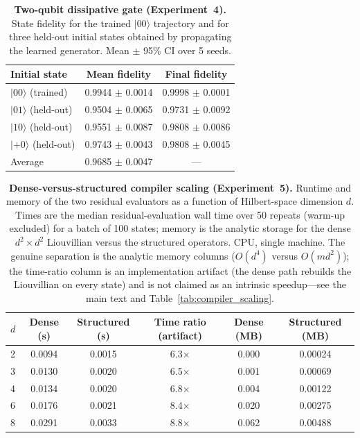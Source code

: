 \documentclass[11pt]{article}
\begin{document}
\begin{table}[ht]
\centering
\caption{\textbf{Two-qubit dissipative gate (Experiment~4).} State fidelity for the trained $\lvert 00\rangle$ trajectory and for three held-out initial states obtained by propagating the learned generator. Mean $\pm$ 95\% CI over 5 seeds.}
\label{tab:exp4}
\begin{tabular}{lcc}
\toprule
Initial state & Mean fidelity & Final fidelity \\
\midrule
$\lvert 00\rangle$ (trained) & 0.9944 $\pm$ 0.0014 & 0.9998 $\pm$ 0.0001 \\
$\lvert 01\rangle$ (held-out) & 0.9504 $\pm$ 0.0065 & 0.9731 $\pm$ 0.0092 \\
$\lvert 10\rangle$ (held-out) & 0.9551 $\pm$ 0.0087 & 0.9808 $\pm$ 0.0086 \\
$\lvert {+}0\rangle$ (held-out) & 0.9743 $\pm$ 0.0043 & 0.9808 $\pm$ 0.0045 \\
\midrule
Average & 0.9685 $\pm$ 0.0047 & --- \\
\bottomrule
\end{tabular}
\end{table}

\begin{table}[ht]
\centering
\caption{\textbf{Dense-versus-structured compiler scaling (Experiment~5).} Runtime and memory of the two residual evaluators as a function of Hilbert-space dimension $d$. Times are the median residual-evaluation wall time over 50 repeats (warm-up excluded) for a batch of 100 states; memory is the analytic storage for the dense $d^2\times d^2$ Liouvillian versus the structured operators. CPU, single machine. The genuine separation is the analytic memory columns ($O(d^4)$ versus $O(md^2)$); the time-ratio column is an implementation artifact (the dense path rebuilds the Liouvillian on every state) and is not claimed as an intrinsic speedup---see the main text and Table~\ref{tab:compiler_scaling}.}
\label{tab:exp5}
\begin{tabular}{lccccc}
\toprule
$d$ & Dense (s) & Structured (s) & Time ratio (artifact) & Dense (MB) & Structured (MB) \\
\midrule
2 & 0.0094 & 0.0015 & 6.3$\times$ & 0.000 & 0.00024 \\
3 & 0.0130 & 0.0020 & 6.5$\times$ & 0.001 & 0.00069 \\
4 & 0.0134 & 0.0020 & 6.8$\times$ & 0.004 & 0.00122 \\
6 & 0.0176 & 0.0021 & 8.4$\times$ & 0.020 & 0.00275 \\
8 & 0.0291 & 0.0033 & 8.8$\times$ & 0.062 & 0.00488 \\
\bottomrule
\end{tabular}
\end{table}
\end{document}
